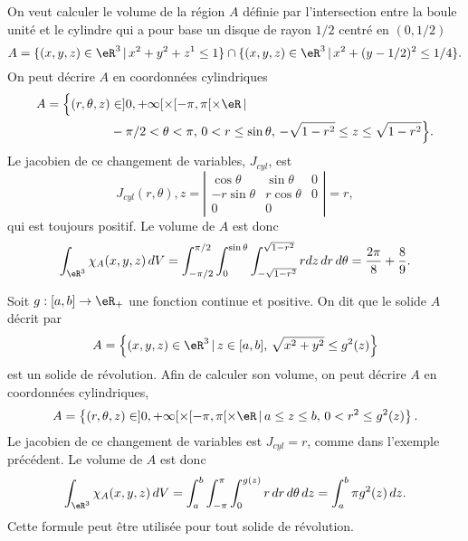 \begin{example}
    On veut calculer le volume de la région $A$ définie par  l'intersection entre la boule unité et le cylindre qui a pour base un disque de rayon $1/2$ centré en $(0, 1/2)$
    \[
    A=\{(x,y,z) \in\eR^3 \,\vert\, x^2+y^2+z^1\leq 1\}\cap\{(x,y,z) \in \eR^3\,\vert\, x^2+(y-1/2)^2\leq 1/4\}.
    \]
    On peut décrire $A$ en coordonnées cylindriques
    \begin{equation}
      \begin{aligned}
        A=\Big\{(r,\theta,z) &\in ]0, +\infty[\times [-\pi,\pi[\times \eR\,\vert\,\\
    & -\pi/2<\theta<\pi, \, 0<r\leq \sin\theta, \, -\sqrt{1-r^2}\leq z\leq\sqrt{1-r^2} \Big\}.
      \end{aligned}
    \end{equation}
    Le jacobien de ce changement de variables,  $J_{cyl}$, est
    \begin{equation}
     J_{cyl}(r, \theta), z= \left\vert\begin{array}{ccc}
    \cos \theta & \sin \theta & 0\\
    -r\sin \theta  & r\cos \theta &0 \\
    0&0&
    \end{array}\right\vert= r,
    \end{equation}
    qui est toujours positif. Le volume de $A$ est donc
    \[
    \int_{\eR^3}\chi_{A}(x,y,z)\, dV=\int_{-\pi/2}^{\pi/2}\int_0^{\sin\theta}\int_{-\sqrt{1-r^2}}^{\sqrt{1-r^2}} r dz\,dr\,d\theta=\frac{2\pi}{8}+\frac{8}{9}.
    \]
\end{example}

\begin{example}
Soit $g:[a,b]\to\eR_+$ une fonction continue et positive. On dit que le solide $A$ décrit par
\[
A=\left\{(x,y,z)\in\eR^3\, \vert \, z\in[a,b], \,\sqrt{x^2+y^2}\leq g^2(z) \right\}
\]
est un solide de révolution. Afin de calculer son volume, on peut décrire $A$ en coordonnées cylindriques,
\[
A=\left\{(r,\theta,z) \in ]0, +\infty[\times [-\pi,\pi[\times \eR\,\vert\, a\leq z\leq b, \, 0<r^2\leq g^2(z) \right\}.
\]
Le jacobien de ce changement de variables est  $J_{cyl}=r$, comme dans l'exemple précédent. Le volume de $A$ est donc
\[
\int_{\eR^3}\chi_{A}(x,y,z)\, dV=\int_a^{b}\int_{-\pi}^{\pi}\int_{0}^{g(z)} r  \,dr\,d\theta\, dz=\int_a^{b} \pi g^2(z) \, dz.
\]
Cette formule peut être utilisée pour tout solide de révolution.
\end{example}

